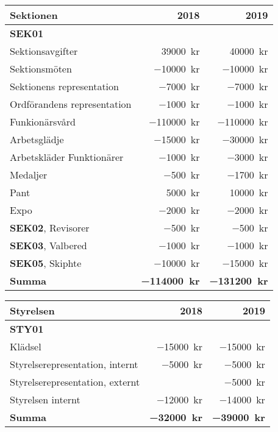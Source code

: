 \documentclass[10pt]{article}
\begin{document}
    \section*{\doctitle}
    \begin{tabularx}{10cm}{X r r}
        \textbf{\large Sektionen} & \textbf{2018} & \textbf{2019} \\
        \hline
        \textbf{SEK01} \\
        Sektionsavgifter & \SI{39000}{kr} & \SI{40000}{kr} \\
        Sektionsmöten & \SI{-10000}{kr} & \SI{-10000}{kr} \\
        Sektionens representation & \SI{-7000}{kr} & \SI{-7000}{kr} \\
        Ordförandens representation & \SI{-1000}{kr} & \SI{-1000}{kr} \\
        Funkionärsvård & \SI{-110000}{kr} & \SI{-110000}{kr} \\
        Arbetsglädje & \SI{-15000}{kr} & \SI{-30000}{kr} \\
        Arbetskläder Funktionärer & \SI{-1000}{kr} & \SI{-3000}{kr} \\
        Medaljer & \SI{-500}{kr} & \SI{-1700}{kr} \\
        Pant & \SI{5000}{kr} & \SI{10000}{kr} \\
        Expo & \SI{-2000}{kr} & \SI{-2000}{kr} \\
        \textbf{SEK02}, Revisorer & \SI{-500}{kr} & \SI{-500}{kr} \\
        \textbf{SEK03}, Valbered & \SI{-1000}{kr} & \SI{-1000}{kr} \\
        \textbf{SEK05}, Skiphte & \SI{-10000}{kr} & \SI{-15000}{kr} \\
        \hline
        \textbf{Summa} & \textbf{\SI{-114000}{kr}} & \textbf{\SI{-131200}{kr}} \\
    \end{tabularx}
    
    \begin{tabularx}{10cm}{X r r}
        \textbf{\large Styrelsen} & \textbf{2018} & \textbf{2019} \\
        \hline
        \textbf{STY01} \\
        Klädsel & \SI{-15000}{kr} & \SI{-15000}{kr} \\
        Styrelserepresentation, internt & \SI{-5000}{kr} & \SI{-5000}{kr} \\
        Styrelserepresentation, externt & \SI{}{} & \SI{-5000}{kr} \\
        Styrelsen internt & \SI{-12000}{kr} & \SI{-14000}{kr} \\
        \hline
        \textbf{Summa} & \textbf{\SI{-32000}{kr}} & \textbf{\SI{-39000}{kr}} \\
    \end{tabularx}
    
\end{document}
